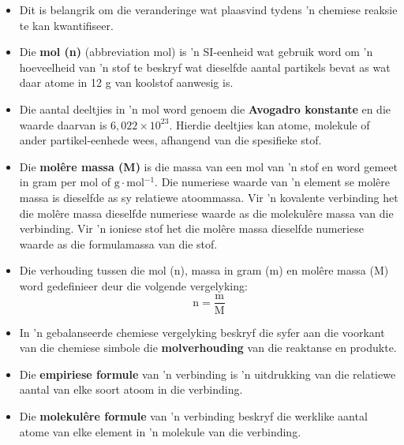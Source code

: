 \pagebreak
{}
            \nopagebreak
      \label{m38712*id285735}\begin{itemize}[noitemsep]
\item Dit is belangrik om die veranderinge wat plaasvind tydens 'n chemiese reaksie te kan kwantifiseer.
\item Die \textbf{mol (n)} (abbreviation mol) is 'n SI-eenheid wat gebruik word om 'n hoeveelheid van  'n stof te beskryf wat dieselfde aantal partikels bevat as wat daar atome in 12 g van koolstof aanwesig is.
\item Die aantal deeltjies in 'n mol word genoem die \textbf{Avogadro konstante} en die waarde daarvan is $6,022 \times {10}^{23}$. Hierdie deeltjies kan atome, molekule of ander partikel-eenhede wees, afhangend van die spesifieke stof.
\item Die \textbf{mol\^{e}re massa (M)} is die massa van een mol van 'n stof en word gemeet in gram per mol of $\text{g} \cdot \text{mol}{}^{-1}$. Die numeriese waarde van 'n element se molêre massa is dieselfde as sy relatiewe atoommassa. Vir 'n kovalente verbinding het die molêre massa dieselfde numeriese waarde as die molekulêre massa van die verbinding. Vir 'n ioniese stof het die molêre massa dieselfde numeriese waarde as die formulamassa van die stof.
\item Die verhouding tussen die mol (n), massa in gram (m) en molêre massa (M) word gedefinieer deur die volgende vergelyking:
\label{m38712*id285862}\nopagebreak\noindent{}
    \begin{equation*}
    \text{n}=\frac{\text{m}}{\text{M}}
      \end{equation*}
\item In 'n gebalanseerde chemiese vergelyking beskryf die syfer aan die voorkant van die chemiese simbole die \textbf{molverhouding} van die reaktanse en produkte.
\item Die \textbf{empiriese formule} van 'n verbinding is 'n uitdrukking van die relatiewe aantal van elke soort atoom in die verbinding.
\item Die \textbf{molekul\^{e}re formule} van 'n verbinding beskryf die werklike aantal atome van elke element in 'n molekule van die verbinding.

\end{itemize}

